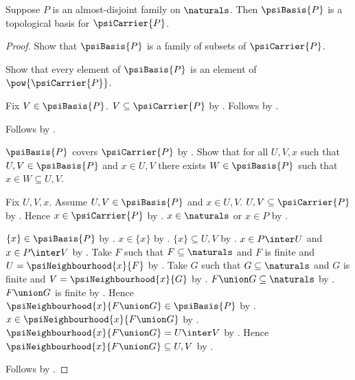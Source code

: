 \begin{theorem}\label{psi_basis_is_topological_basis}
    Suppose $P$ is an almost-disjoint family on $\naturals$.
    Then $\psiBasis{P}$ is a topological basis for $\psiCarrier{P}$.
\end{theorem}
\begin{proof}
    Show that $\psiBasis{P}$ is a family of subsets of $\psiCarrier{P}$.
    \begin{subproof}
        Show that every element of $\psiBasis{P}$ is an element of
            $\pow{\psiCarrier{P}}$.
        \begin{subproof}
            Fix $V\in\psiBasis{P}$.
            $V\subseteq\psiCarrier{P}$
                by .
            Follows by .
        \end{subproof}
        Follows by .
    \end{subproof}
    $\psiBasis{P}$ covers $\psiCarrier{P}$
        by .
    Show that for all $U,V,x$ such that
        $U,V\in\psiBasis{P}$ and $x\in U,V$
        there exists $W\in\psiBasis{P}$ such that
            $x\in W\subseteq U,V$.
    \begin{subproof}
        Fix $U,V,x$.
        Assume $U,V\in\psiBasis{P}$ and $x\in U,V$.
        $U,V\subseteq\psiCarrier{P}$
            by .
        Hence $x\in\psiCarrier{P}$ by .
        $x\in\naturals$ or $x\in P$ by .
        \begin{byCase}
                $\{x\}\in\psiBasis{P}$
                    by .
                $x\in\{x\}$ by .
                $\{x\}\subseteq U,V$ by .
                $x\in P\inter U$ and $x\in P\inter V$
                    by .
                Take $F$ such that $F\subseteq\naturals$ and $F$ is finite
                    and $U=\psiNeighbourhood{x}{F}$
                    by .
                Take $G$ such that $G\subseteq\naturals$ and $G$ is finite
                    and $V=\psiNeighbourhood{x}{G}$
                    by .
                $F\union G\subseteq\naturals$
                    by .
                $F\union G$ is finite by .
                Hence $\psiNeighbourhood{x}{F\union G}\in\psiBasis{P}$
                    by .
                $x\in\psiNeighbourhood{x}{F\union G}$
                    by .
                $\psiNeighbourhood{x}{F\union G}=U\inter V$
                    by .
                Hence $\psiNeighbourhood{x}{F\union G}\subseteq U,V$
                    by .
        \end{byCase}
    \end{subproof}
    Follows by .
\end{proof}

